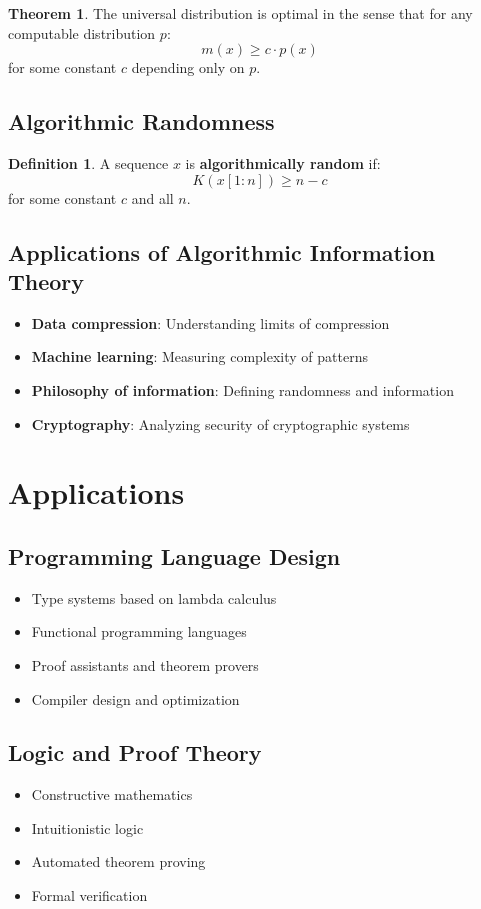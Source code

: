 \documentclass[11pt]{article}
\theoremstyle{definition}
\newtheorem{definition}{Definition}[section]
\newtheorem{theorem}{Theorem}[section]
\begin{document}
\begin{theorem}
The universal distribution is optimal in the sense that for any computable distribution $p$:
$$m(x) \geq c \cdot p(x)$$
for some constant $c$ depending only on $p$.
\end{theorem}

\subsection{Algorithmic Randomness}
\begin{definition}
A sequence $x$ is \textbf{algorithmically random} if:
$$K(x[1:n]) \geq n - c$$
for some constant $c$ and all $n$.
\end{definition}

\subsection{Applications of Algorithmic Information Theory}
\begin{itemize}
    \item \textbf{Data compression}: Understanding limits of compression
    \item \textbf{Machine learning}: Measuring complexity of patterns
    \item \textbf{Philosophy of information}: Defining randomness and information
    \item \textbf{Cryptography}: Analyzing security of cryptographic systems
\end{itemize}

\section{Applications}

\subsection{Programming Language Design}
\begin{itemize}
    \item Type systems based on lambda calculus
    \item Functional programming languages
    \item Proof assistants and theorem provers
    \item Compiler design and optimization
\end{itemize}

\subsection{Logic and Proof Theory}
\begin{itemize}
    \item Constructive mathematics
    \item Intuitionistic logic
    \item Automated theorem proving
    \item Formal verification
\end{itemize}
\end{document}
